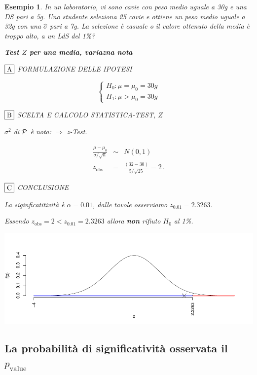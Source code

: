 \documentclass[
  11pt,
]{book}
\theoremstyle{mytheoremstyle}
\theoremstyle{mydefstyle}
\newtheorem{example}{{Esempio}}[section]
\begin{document}
\begin{example}

In un laboratorio, vi sono cavie con peso medio uguale a 30g e una DS
pari a 5g. Uno studente seleziona 25 cavie e ottiene un peso medio
uguale a 32g con una \(\hat\sigma\) pari a 7g. La selezione è casuale o il
valore ottenuto della media è troppo alto, a un LdS del 1\%?

\textbf{Test \(Z\) per una media, variazna nota}

\(\fbox{A}\) FORMULAZIONE DELLE IPOTESI

\[\begin{cases}
   H_0: \mu = \mu_0=30g \\
   H_1: \mu > \mu_0=30g 
   \end{cases}\]

\(\fbox{B}\) SCELTA E CALCOLO STATISTICA-TEST, \(Z\)

\(\sigma^{2}\) di \(\cal{P}\) è nota: \(\Rightarrow\) z-Test.

\begin{eqnarray*}
   \frac{\hat\mu - \mu_{0}} {\sigma/\sqrt{n}}&\sim&N(0,1)\\
   z_{\text{obs}}
   &=& \frac{ ( 32 -  30 )} { 5 /\sqrt{ 25 }}
   =   2 \, .
   \end{eqnarray*}

\(\fbox{C}\) CONCLUSIONE

La siginficatitività è \(\alpha=0.01\), dalle tavole osserviamo \(z_{0.01}=2.3263\).

Essendo \(z_\text{obs}=2<z_{0.01}=2.3263\) allora \textbf{non} rifiuto \(H_0\) al 1\%.

\begin{center}\includegraphics{Appunti_di_Statistica_2025_files/figure-latex/15-test-mu-pi-2-1} \end{center}

\end{example}

\subsection{\texorpdfstring{La probabilità di significatività osservata il \(p_\text{value}\)}{La probabilità di significatività osservata il p\_\textbackslash text\{value\}}}\label{la-probabilituxe0-di-significativituxe0-osservata-il-p_textvalue}
\end{document}
